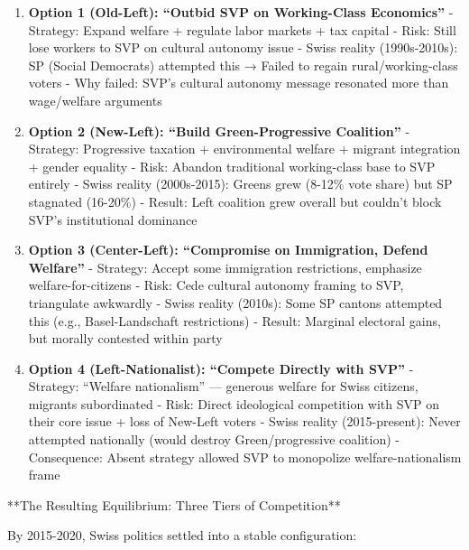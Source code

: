 \begin{enumerate}

\item \textbf{Option 1 (Old-Left): ``Outbid SVP on Working-Class Economics''}
   - Strategy: Expand welfare + regulate labor markets + tax capital
   - Risk: Still lose workers to SVP on cultural autonomy issue
   - Swiss reality (1990s-2010s): SP (Social Democrats) attempted this → Failed to regain rural/working-class voters
   - Why failed: SVP's cultural autonomy message resonated more than wage/welfare arguments

\item \textbf{Option 2 (New-Left): ``Build Green-Progressive Coalition''}
   - Strategy: Progressive taxation + environmental welfare + migrant integration + gender equality
   - Risk: Abandon traditional working-class base to SVP entirely
   - Swiss reality (2000s-2015): Greens grew (8-12\% vote share) but SP stagnated (16-20\%)
   - Result: Left coalition grew overall but couldn't block SVP's institutional dominance

\item \textbf{Option 3 (Center-Left): ``Compromise on Immigration, Defend Welfare''}
   - Strategy: Accept some immigration restrictions, emphasize welfare-for-citizens
   - Risk: Cede cultural autonomy framing to SVP, triangulate awkwardly
   - Swiss reality (2010s): Some SP cantons attempted this (e.g., Basel-Landschaft restrictions)
   - Result: Marginal electoral gains, but morally contested within party

\item \textbf{Option 4 (Left-Nationalist): ``Compete Directly with SVP''}
   - Strategy: ``Welfare nationalism'' — generous welfare for Swiss citizens, migrants subordinated
   - Risk: Direct ideological competition with SVP on their core issue + loss of New-Left voters
   - Swiss reality (2015-present): Never attempted nationally (would destroy Green/progressive coalition)
   - Consequence: Absent strategy allowed SVP to monopolize welfare-nationalism frame

\end{enumerate}

**The Resulting Equilibrium: Three Tiers of Competition**

By 2015-2020, Swiss politics settled into a stable configuration:

